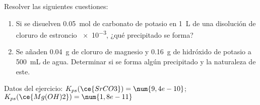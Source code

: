 Resolver las siguientes cuestiones:
\begin{enumerate}[label={\alph*)},font={\color{red!50!black}\bfseries}]
	\item Si se disuelven \SI{0,05}{\mol} de carbonato de potasio en \SI{1}{\liter} de una disolución de cloruro de estroncio \SI{e-3}{\Molar}, ¿qué precipitado se forma?
 	\item Se añaden \SI{0,04}{\gram} de cloruro de magnesio y \SI{0,16}{\gram} de hidróxido de potasio a \SI{500}{\milli\liter} de agua. Determinar si se forma algún precipitado y la naturaleza de este.
\end{enumerate}
Datos del ejercicio: $K_{ps}(\ce{SrCO3}) = \num{9,4e-10}$; $K_{ps}(\ce{Mg(OH)2}) = \num{1,8e-11}$
